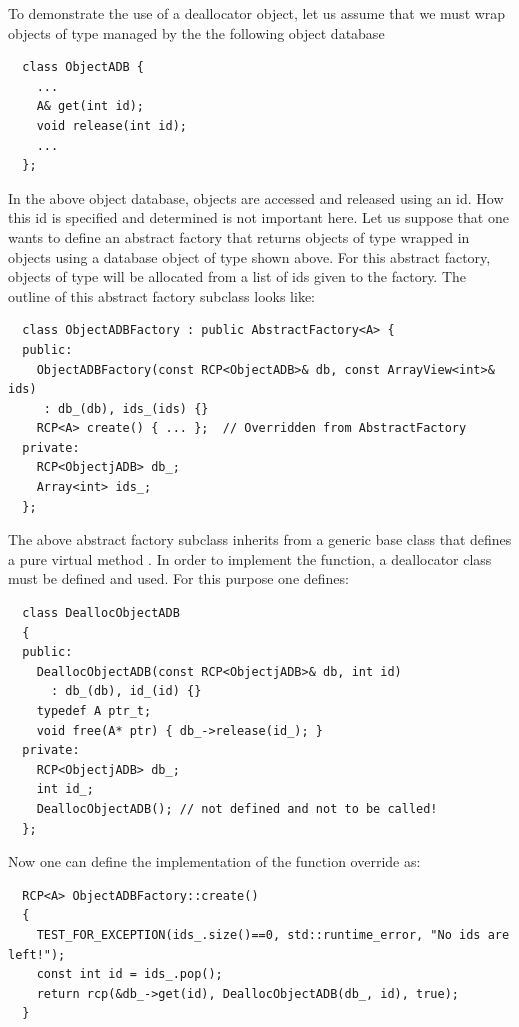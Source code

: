 \documentclass[pdf,ps2pdf,11pt]{SANDreport}
\begin{document}
To demonstrate the use of a deallocator object, let us assume that we
must wrap objects of type {} managed by the the following
object database

{\small\begin{verbatim}
  class ObjectADB {
    ...
    A& get(int id);
    void release(int id);
    ...
  };
\end{verbatim}}

In the above object database, objects are accessed and released using
an id.  How this id is specified and determined is not important here.
Let us suppose that one wants to define an abstract factory that
returns objects of type {} wrapped in {} objects
using a database object of type {} shown above.  For
this abstract factory, objects of type {} will be allocated
from a list of ids given to the factory.  The outline of this abstract
factory subclass looks like:

{\small\begin{verbatim}
  class ObjectADBFactory : public AbstractFactory<A> {
  public:
    ObjectADBFactory(const RCP<ObjectADB>& db, const ArrayView<int>& ids)
     : db_(db), ids_(ids) {}
    RCP<A> create() { ... };  // Overridden from AbstractFactory
  private:
    RCP<ObjectjADB> db_;
    Array<int> ids_;
  };
\end{verbatim}}

The above abstract factory subclass {} inherits
from a generic {} base class that defines a pure
virtual method {}.  In order to implement the
{} function, a deallocator class must be defined and
used.  For this purpose one defines:

{\small\begin{verbatim}
  class DeallocObjectADB
  {
  public:
    DeallocObjectADB(const RCP<ObjectjADB>& db, int id)
      : db_(db), id_(id) {}
    typedef A ptr_t;
    void free(A* ptr) { db_->release(id_); }
  private:
    RCP<ObjectjADB> db_;
    int id_;
    DeallocObjectADB(); // not defined and not to be called!
  };
\end{verbatim}}

Now one can define the implementation of the {} function
override as:

{\small\begin{verbatim}
  RCP<A> ObjectADBFactory::create()
  {
    TEST_FOR_EXCEPTION(ids_.size()==0, std::runtime_error, "No ids are left!");
    const int id = ids_.pop();
    return rcp(&db_->get(id), DeallocObjectADB(db_, id), true);
  }
\end{verbatim}}
\end{document}
